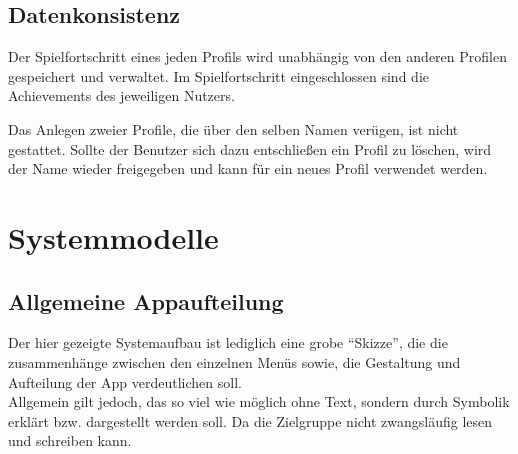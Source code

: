 \documentclass{scrartcl}
\begin{document}
\subsection{Datenkonsistenz}

\begin{telist}[resume]
	\item Der Spielfortschritt eines jeden Profils wird unabhängig von den anderen Profilen gespeichert und verwaltet. Im Spielfortschritt eingeschlossen sind die Achievements des jeweiligen Nutzers.
	\item Das Anlegen zweier Profile, die über den selben Namen verügen, ist nicht gestattet. Sollte der Benutzer sich dazu entschließen ein Profil zu löschen, wird der Name wieder freigegeben und kann für ein neues Profil verwendet werden.
\end{telist}

\clearpage











\section{Systemmodelle}

\subsection{Allgemeine Appaufteilung}

Der hier gezeigte Systemaufbau ist lediglich eine grobe \enquote{Skizze},
die die zusammenhänge zwischen den einzelnen Menüs sowie, 
die Gestaltung und Aufteilung der App verdeutlichen soll.\\
Allgemein gilt jedoch, das so viel wie möglich ohne Text, sondern durch Symbolik erklärt bzw. dargestellt werden soll. Da die Zielgruppe nicht zwangsläufig lesen und schreiben kann.\\
\end{document}
